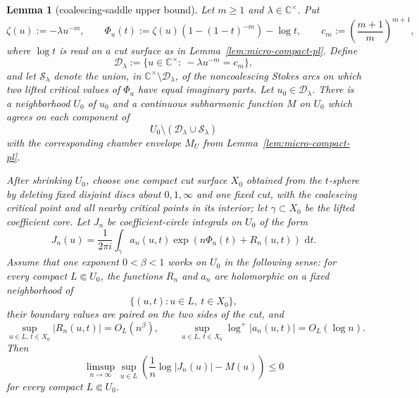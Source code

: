 \documentclass[reqno]{article}
\newtheorem{lem}[theorem]{Lemma}
\theoremstyle{definition}
\theoremstyle{remark}
\theoremstyle{plain}
\newcommand{\C}{\mathbb C}
\newcommand{\dd}{\,\mathrm d}
\begin{document}
\begin{lem}[coalescing-saddle upper bound]\label{lem:micro-coalescing-upper}
Let $m\ge1$ and $\lambda\in\C^\times$. Put
\[
\zeta(u):=-\lambda u^{-m},\qquad
\Phi_u(t):=\zeta(u)(1-(1-t)^{-m})-\log t,
\qquad
c_m:=\left(\frac{m+1}{m}\right)^{m+1},
\]
where $\log t$ is read on a cut surface as in Lemma~\ref{lem:micro-compact-pl}. Define
\[
\mathcal D_\lambda:=\{u\in\C^\times:\ -\lambda u^{-m}=c_m\},
\]
and let $\mathcal S_\lambda$ denote the union, in $\C^\times\setminus\mathcal D_\lambda$, of the noncoalescing Stokes arcs on which two lifted critical values of $\Phi_u$ have equal imaginary parts. Let $u_0\in\mathcal D_\lambda$. There is a neighborhood $U_0$ of $u_0$ and a continuous subharmonic function $M$ on $U_0$ which agrees on each component of
\[
U_0\setminus(\mathcal D_\lambda\cup\mathcal S_\lambda)
\]
with the corresponding chamber envelope $M_U$ from Lemma~\ref{lem:micro-compact-pl}.

After shrinking $U_0$, choose one compact cut surface $X_0$ obtained from the $t$-sphere by deleting fixed disjoint discs about $0,1,\infty$ and one fixed cut, with the coalescing critical point and all nearby critical points in its interior; let $\gamma\subset X_0$ be the lifted coefficient core. Let $J_n$ be coefficient-circle integrals on $U_0$ of the form
\[
J_n(u)=\frac1{2\pi i}\int_\gamma a_n(u,t)
\exp\!\left(n\Phi_u(t)+R_n(u,t)\right)\,\dd t.
\]
Assume that one exponent $0<\beta<1$ works on $U_0$ in the following sense: for every compact $L\Subset U_0$, the functions $R_n$ and $a_n$ are holomorphic on a fixed neighborhood of
\[
\{(u,t):u\in L,\ t\in X_0\},
\]
their boundary values are paired on the two sides of the cut, and
\[
\sup_{u\in L,\,t\in X_0} |R_n(u,t)|=O_L(n^\beta),
\qquad
\sup_{u\in L,\,t\in X_0} \log^+|a_n(u,t)|=O_L(\log n).
\]
Then
\[
\limsup_{n\to\infty}\sup_{u\in L}
\left(\frac1n\log|J_n(u)|-M(u)\right)
\le0
\]
for every compact $L\Subset U_0$.
\end{lem}
\end{document}
